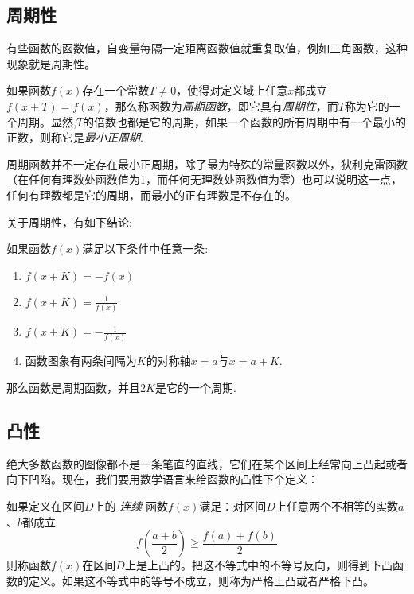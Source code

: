 \subsection{周期性}
\label{sec:periodicity-of-function}

有些函数的函数值，自变量每隔一定距离函数值就重复取值，例如三角函数，这种现象就是周期性。

\begin{definition}
  如果函数$f(x)$存在一个常数$T \neq 0$，使得对定义域上任意$x$都成立$f(x+T)=f(x)$，那么称函数为\emph{周期函数}，即它具有\emph{周期性}，而$T$称为它的一个周期。显然,$T$的倍数也都是它的周期，如果一个函数的所有周期中有一个最小的正数，则称它是\emph{最小正周期}.
\end{definition}

周期函数并不一定存在最小正周期，除了最为特殊的常量函数以外，狄利克雷函数（在任何有理数处函数值为1，而任何无理数处函数值为零）也可以说明这一点，任何有理数都是它的周期，而最小的正有理数是不存在的。

关于周期性，有如下结论:
\begin{theorem}
  如果函数$f(x)$满足以下条件中任意一条:
  \begin{enumerate}
  \item $f(x+K)=-f(x)$
  \item $f(x+K)=\frac{1}{f(x)}$
  \item $f(x+K)=-\frac{1}{f(x)}$
  \item 函数图象有两条间隔为$K$的对称轴$x=a$与$x=a+K$.
  \end{enumerate}
  那么函数是周期函数，并且$2K$是它的一个周期.
\end{theorem}

\subsection{凸性}
\label{sec:convex-property-of-function}

绝大多数函数的图像都不是一条笔直的直线，它们在某个区间上经常向上凸起或者向下凹陷。现在，我们要用数学语言来给函数的凸性下个定义：
\begin{definition}
 如果定义在区间$D$上的 \emph{连续} 函数$f(x)$满足：对区间$D$上任意两个不相等的实数$a$、$b$都成立
 \begin{equation}
   \label{eq:the-definition-of-convexity-function}
f(\frac{a+b}{2}) \geqslant \frac{f(a)+f(b)}{2}
 \end{equation}
则称函数$f(x)$在区间$D$上是上凸的。把这不等式中的不等号反向，则得到下凸函数的定义。如果这不等式中的等号不成立，则称为严格上凸或者严格下凸。
\end{definition}


